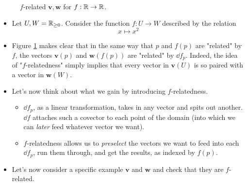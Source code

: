\documentclass[../notes.tex]{subfiles}
\begin{document}
\begin{itemize}
\begin{figure}[h!]
        \caption{$f$-related $\bm{v},\bm{w}$ for $f:\mathbb{R}\to\mathbb{R}$.}
        \label{fig:fRelated}
    \end{figure}
    \begin{itemize}
        \item Let $U,W=\mathbb{R}_{\geq 0}$. Consider the function $f:U\to W$ described by the relation
        \begin{equation*}
            x \mapsto x^2
        \end{equation*}
        \item Figure \ref{fig:fRelated} makes clear that in the same way that $p$ and $f(p)$ are "related" by $f$, the vectors $\bm{v}(p)$ and $\bm{w}(f(p))$ are "related" by $\dd f_p$. Indeed, the idea of "$f$-relatedness" simply implies that every vector in $\bm{v}(U)$ is so paired with a vector in $\bm{w}(W)$.
        \item Let's now think about what we gain by introducing $f$-relatedness.
        \begin{itemize}
            \item $\dd f_p$, as a linear transformation, takes in any vector and spits out another. $\dd f$ attaches such a covector to each point of the domain (into which we can \emph{later} feed whatever vector we want).
            \item $f$-relatedness allows us to \emph{preselect} the vectors we want to feed into each $\dd f_p$, run them through, and get the results, as indexed by $f(p)$.
        \end{itemize}
        \item Let's now consider a specific example $\bm{v}$ and $\bm{w}$ and check that they are $f$-related.

\end{itemize}
\end{itemize}
\end{document}
